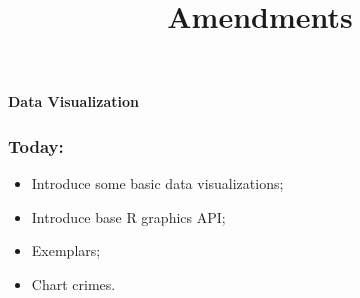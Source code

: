 \documentclass[aspectratio=169]{beamer}
\title{Amendments}
\date{}
\theoremstyle{principle}
\begin{document}


{
  \begin{frame}[plain]
  
\begin{mdframed}[tikzsetting={draw=white,fill=white,fill opacity=0.6,draw opacity=0.4,
               line width=0pt},backgroundcolor=none,leftmargin=20,
               rightmargin=20,innertopmargin=4pt]
\begin{center}
\Huge \textbf{Data Visualization}
\end{center}
\end{mdframed}

  \end{frame}
}


\begin{frame}
\frametitle{Today:}

\begin{itemize}
\item Introduce some basic data visualizations;
\bigskip
\bigskip
\item Introduce base R graphics API;
\bigskip
\bigskip
\item Exemplars;
\bigskip
\bigskip
\item Chart crimes.
\end{itemize}

\end{frame}
\end{document}
